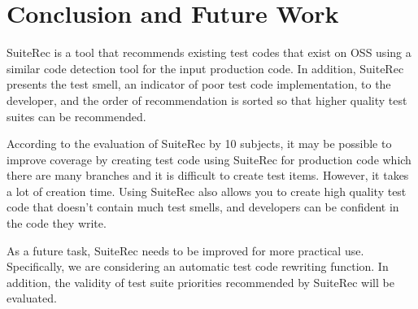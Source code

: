 \documentclass[conference]{IEEEtran}
\begin{document}

\section{Conclusion and Future Work}
SuiteRec is a tool that recommends existing test codes that exist on OSS using a similar code detection tool for the input production code. In addition, SuiteRec presents the test smell, an indicator of poor test code implementation, to the developer, and the order of recommendation is sorted so that higher quality test suites can be recommended.

According to the evaluation of SuiteRec by 10 subjects, it may be possible to improve coverage by creating test code using SuiteRec for production code which there are many branches and it is difficult to create test items. However, it takes a lot of creation time. Using SuiteRec also allows you to create high quality test code that doesn't contain much test smells, and developers can be confident in the code they write. 

As a future task, SuiteRec needs to be improved for more practical use. Specifically, we are considering an automatic test code rewriting function. In addition, the validity of test suite priorities recommended by SuiteRec will be evaluated.
\end{document}
